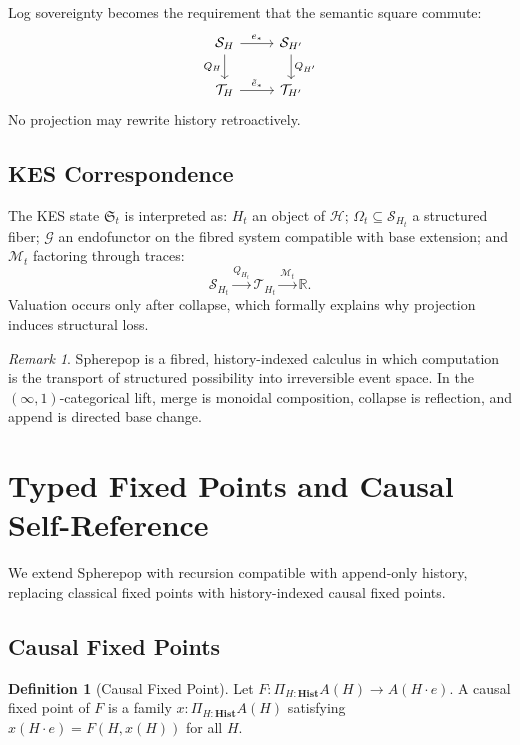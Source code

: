 \documentclass[11pt,a4paper]{article}
\theoremstyle{definition}
\newtheorem{definition}[theorem]{Definition}
\theoremstyle{remark}
\newtheorem{remark}[theorem]{Remark}
\begin{document}
Log sovereignty becomes the requirement that the semantic square commute:
\[
\begin{tikzcd}
\mathcal{S}_H \arrow[r, "e_*"] \arrow[d, "Q_H"'] & \mathcal{S}_{H'} \arrow[d, "Q_{H'}"] \\
\mathcal{T}_H \arrow[r, "\tilde{e}_*"] & \mathcal{T}_{H'}
\end{tikzcd}
\]
No projection may rewrite history retroactively.

\subsection{KES Correspondence}

The KES state $\mathfrak{S}_t$ is interpreted as: $H_t$ an object of $\mathcal{H}$; $\Omega_t \subseteq \mathcal{S}_{H_t}$ a structured fiber; $\mathcal{G}$ an endofunctor on the fibred system compatible with base extension; and $\mathcal{M}_t$ factoring through traces:
\[
\mathcal{S}_{H_t} \xrightarrow{Q_{H_t}} \mathcal{T}_{H_t} \xrightarrow{\mathcal{M}_t} \mathbb{R}.
\]
Valuation occurs only after collapse, which formally explains why projection induces structural loss.

\begin{remark}
Spherepop is a fibred, history-indexed calculus in which computation is the transport of structured possibility into irreversible event space. In the $(\infty,1)$-categorical lift, merge is monoidal composition, collapse is reflection, and append is directed base change.
\end{remark}

\section{Typed Fixed Points and Causal Self-Reference}

We extend Spherepop with recursion compatible with append-only history, replacing classical fixed points with history-indexed causal fixed points.

\subsection{Causal Fixed Points}

\begin{definition}[Causal Fixed Point]
Let $F : \Pi_{H:\mathbf{Hist}} A(H) \to A(H \cdot e)$. A causal fixed point of $F$ is a family $x : \Pi_{H:\mathbf{Hist}} A(H)$ satisfying $x(H \cdot e) = F(H, x(H))$ for all $H$.
\end{definition}
\end{document}
